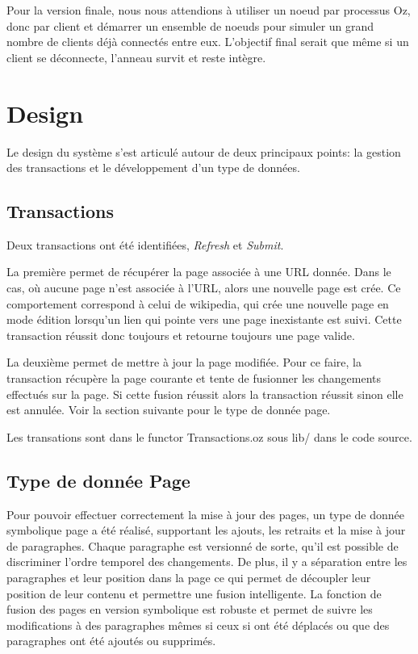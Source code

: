 \documentclass{article}
\begin{document}
	Pour la version finale, nous nous attendions à utiliser un noeud par processus Oz, donc par client et démarrer
	un ensemble de noeuds pour simuler un grand nombre de clients déjà connectés entre eux.  L'objectif final
	serait que même si un client se déconnecte, l'anneau survit et reste intègre.
	
	
	\section{Design}
	Le design du système s'est articulé autour de deux principaux points: la gestion des transactions et le développement
	d'un type de données.
	
	\subsection{Transactions}
	Deux transactions ont été identifiées, \textit{Refresh} et \textit{Submit}.  
	
	La première permet de récupérer la page associée à une URL donnée.  Dans le cas, où aucune page 
	n'est associée à l'URL, alors une nouvelle page est crée.  Ce comportement
	correspond à celui de wikipedia, qui crée une nouvelle page en mode édition lorsqu'un lien qui pointe vers une page
	inexistante est suivi.  Cette transaction réussit donc toujours et retourne toujours une page valide.
	
	La deuxième permet de mettre à jour la page modifiée.  Pour ce faire, la transaction récupère la page
	courante et tente de fusionner les changements effectués sur la page.  Si cette fusion réussit alors
	la transaction réussit sinon elle est annulée.  Voir la section suivante pour le type de donnée page.
	
	Les transations sont dans le functor Transactions.oz sous lib/ dans le code source.
	
	\subsection{Type de donnée Page}
	Pour pouvoir effectuer correctement la mise à jour des pages, un type de donnée symbolique page a été réalisé,
	supportant les ajouts, les retraits et la mise à jour de paragraphes.  Chaque paragraphe est versionné de sorte,
	qu'il est possible de discriminer l'ordre temporel des changements.  De plus, il y a séparation entre les paragraphes
	et leur position dans la page ce qui permet de découpler leur position de leur contenu et permettre une fusion intelligente.
	 La fonction de fusion des pages en version symbolique est robuste et permet de suivre les modifications à 
	 des paragraphes mêmes si ceux si ont été déplacés ou que des paragraphes ont été ajoutés ou supprimés.  
	 
\end{document}
